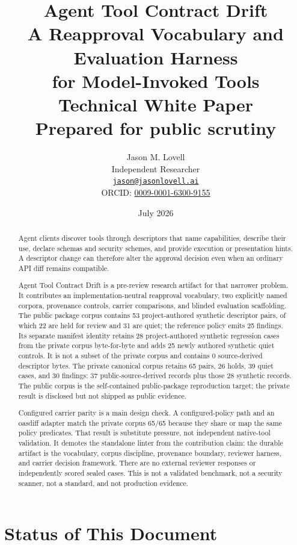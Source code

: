 \documentclass[11pt,letterpaper]{article}
\title{
    \vspace{-1.2cm}
    \textbf{Agent Tool Contract Drift}\\[0.35em]
    \Large A Reapproval Vocabulary and Evaluation Harness\\
    \Large for Model-Invoked Tools\\[0.45em]
    \large Technical White Paper\\[-0.1em]
    \normalsize Prepared for public scrutiny
}
\author{
    Jason M. Lovell\\
    \small Independent Researcher\\
    \small\texttt{\href{mailto:jason@jasonlovell.ai}{jason@jasonlovell.ai}}\\
    \small ORCID: \href{https://orcid.org/0009-0001-6300-9155}{0009-0001-6300-9155}
}
\date{July 2026}
\newcommand{\project}{Agent Tool Contract Drift}
\begin{document}
\maketitle
\thispagestyle{plain}

\begin{abstract}
\noindent
Agent clients discover tools through descriptors that name capabilities, describe their use, declare schemas and security schemes, and provide execution or presentation hints. A descriptor change can therefore alter the approval decision even when an ordinary API diff remains compatible.

\project{} is a pre-review research artifact for that narrower problem. It contributes an implementation-neutral reapproval vocabulary, two explicitly named corpora, provenance controls, carrier comparisons, and blinded evaluation scaffolding. The public package corpus contains 53 project-authored synthetic descriptor pairs, of which 22 are held for review and 31 are quiet; the reference policy emits 25 findings. Its separate manifest identity retains 28 project-authored synthetic regression cases from the private corpus byte-for-byte and adds 25 newly authored synthetic quiet controls. It is not a subset of the private corpus and contains 0 source-derived descriptor bytes. The private canonical corpus retains 65 pairs, 26 holds, 39 quiet cases, and 30 findings: 37 public-source-derived records plus those 28 synthetic records. The public corpus is the self-contained public-package reproduction target; the private result is disclosed but not shipped as public evidence.

Configured carrier parity is a main design check. A configured-policy path and an oasdiff adapter match the private corpus 65/65 because they share or map the same policy predicates. That result is substitute pressure, not independent native-tool validation. It demotes the standalone linter from the contribution claim: the durable artifact is the vocabulary, corpus discipline, provenance boundary, reviewer harness, and carrier decision framework. There are no external reviewer responses or independently scored sealed cases. This is not a validated benchmark, not a security scanner, not a standard, and not production evidence.
\end{abstract}

\newpage
\section*{Status of This Document}
\end{document}
